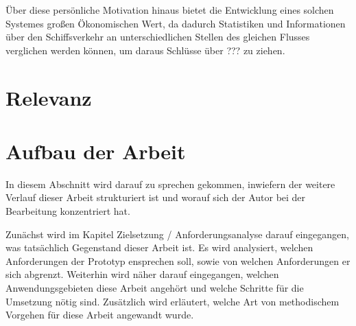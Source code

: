 \"Uber diese persönliche Motivation hinaus bietet die Entwicklung eines solchen Systemes gro\ss{}en \"Okonomischen Wert, da dadurch Statistiken und Informationen über den Schiffsverkehr an unterschiedlichen Stellen des gleichen Flusses verglichen werden können, um daraus Schlüsse über ??? zu ziehen.

\section{Relevanz}
\section{Aufbau der Arbeit}
In diesem Abschnitt wird darauf zu sprechen gekommen, inwiefern der weitere Verlauf dieser Arbeit strukturiert ist und worauf sich der Autor bei der Bearbeitung konzentriert hat.

Zunächst wird im Kapitel Zielsetzung / Anforderungsanalyse darauf eingegangen, was tatsächlich Gegenstand dieser Arbeit ist. Es wird analysiert, welchen Anforderungen der Prototyp ensprechen soll, sowie von welchen Anforderungen er sich abgrenzt. Weiterhin wird näher darauf eingegangen, welchen Anwendungsgebieten diese Arbeit angehört und welche Schritte für die Umsetzung nötig sind. Zusätzlich wird erläutert, welche Art von methodischem Vorgehen für diese Arbeit angewandt wurde.